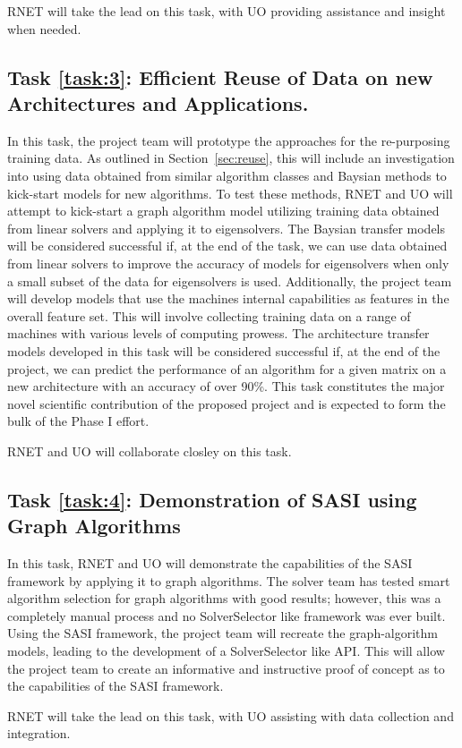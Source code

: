 RNET will take the lead on this task, with UO providing assistance and insight when needed. 


\label{task:3}
\subsection{Task \ref{task:3}: Efficient Reuse of Data on new Architectures and Applications.}
In this task, the project team will prototype the approaches for the re-purposing training data. As outlined in Section~\ref{sec:reuse}, this will include an investigation into using data obtained from similar algorithm classes and Baysian methods to kick-start models for new algorithms. To test these methods, RNET and UO will attempt to kick-start a graph algorithm model utilizing training data obtained from linear solvers and applying it to eigensolvers. The Baysian transfer models will be considered successful if, at the end of the task, we can use data obtained from linear solvers to improve the accuracy of models for eigensolvers when only a small subset of the data for eigensolvers is used. 
Additionally, the project team will develop models that use the machines internal capabilities as features in the overall feature set. This will involve collecting training data on a range of machines with various levels of computing prowess. The architecture transfer models developed in this task will be considered successful if, at the end of the project, we can predict the performance of an algorithm for a given matrix on a new architecture with an accuracy of over 90\%. This task constitutes the major novel scientific contribution of the proposed project and is expected to form the bulk of the Phase I effort. 

RNET and UO will collaborate closley on this task. 

\label{task:4}
\subsection{Task \ref{task:4}: Demonstration of SASI using Graph Algorithms }
In this task, RNET and UO will demonstrate the capabilities of the SASI framework by applying 
it to graph algorithms. The solver team has tested smart algorithm selection for graph algorithms 
with good results; however, this was a completely manual process and no SolverSelector like framework was ever built. Using 
the SASI framework, the project team will recreate the graph-algorithm models, leading to the development of a SolverSelector
like API. This will allow the project team to create an informative and instructive proof of concept as to the capabilities 
of the SASI framework. 

RNET will take the lead on this task, with UO assisting with data collection and integration. 
